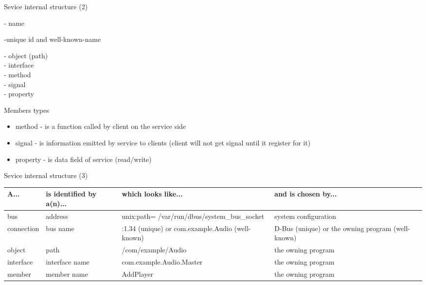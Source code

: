 \documentclass{beamer}
\begin{document}
\begin{frame}{Sevice internal structure (2)}
\begin{huge}
- name 
\begin{normalsize}
-unique id and well-known-name\\
\end{normalsize}
\hspace{1cm}- object (path)\\
\hspace{2cm}- interface\\
\hspace{3cm}- method\\
\hspace{3cm}- signal\\
\hspace{3cm}- property\\
\end{huge}
\end{frame}

\begin{frame}{Members types}
  \begin{itemize}
    \item method - is a function called by client on the service side
    \item signal - is information emitted by service to clients (client will not get signal until it register for it)
    \item property - is data field of service (read/write)
  \end{itemize}
\end{frame}

\begin{frame}{Sevice internal structure (3)}
  \begin{center}
    \begin{tiny}
      \begin{tabulary}{1.0\textwidth}{|L|L|L|L|}
\hline
A... & is identified by a(n)... & which looks like... & and is chosen by...\\
\hline
\hline
bus & address & unix:path= /var/run/dbus/system\_bus\_socket & system configuration\\
\hline
connection & bus name & :1.34 (unique) or com.example.Audio (well-known) & D-Bus (unique) or the owning program (well-known)\\
\hline
object & path & /com/example/Audio & the owning program\\
\hline
interface & interface name & com.example.Audio.Master & the owning program\\
\hline
member & member name & AddPlayer & the owning program\\
\hline
      \end{tabulary}
    \end{tiny}
  \end{center}
\end{frame}
\end{document}
